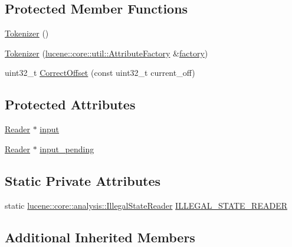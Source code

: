 \subsection*{Protected Member Functions}
\begin{DoxyCompactItemize}
\item 
\mbox{\hyperlink{classlucene_1_1core_1_1analysis_1_1Tokenizer_a2a6c04ea8c784f66bebcb6df7073769c}{Tokenizer}} ()
\item 
\mbox{\hyperlink{classlucene_1_1core_1_1analysis_1_1Tokenizer_a88b02b1592e51baa95cd41090183ee8b}{Tokenizer}} (\mbox{\hyperlink{classlucene_1_1core_1_1util_1_1AttributeFactory}{lucene\+::core\+::util\+::\+Attribute\+Factory}} \&\mbox{\hyperlink{classlucene_1_1core_1_1util_1_1AttributeSource_a1376420a752f337a0fdb582bdf160eba}{factory}})
\item 
uint32\+\_\+t \mbox{\hyperlink{classlucene_1_1core_1_1analysis_1_1Tokenizer_a4c10a2cdbd688233cddb87151a8bf168}{Correct\+Offset}} (const uint32\+\_\+t current\+\_\+off)
\end{DoxyCompactItemize}
\subsection*{Protected Attributes}
\begin{DoxyCompactItemize}
\item 
\mbox{\hyperlink{classlucene_1_1core_1_1analysis_1_1Reader}{Reader}} $\ast$ \mbox{\hyperlink{classlucene_1_1core_1_1analysis_1_1Tokenizer_a376df6bd42b18d1175168b9529b7665e}{input}}
\item 
\mbox{\hyperlink{classlucene_1_1core_1_1analysis_1_1Reader}{Reader}} $\ast$ \mbox{\hyperlink{classlucene_1_1core_1_1analysis_1_1Tokenizer_ac968137c9d44ef57a69c8df4e6e628ff}{input\+\_\+pending}}
\end{DoxyCompactItemize}
\subsection*{Static Private Attributes}
\begin{DoxyCompactItemize}
\item 
static \mbox{\hyperlink{classlucene_1_1core_1_1analysis_1_1IllegalStateReader}{lucene\+::core\+::analysis\+::\+Illegal\+State\+Reader}} \mbox{\hyperlink{classlucene_1_1core_1_1analysis_1_1Tokenizer_a8ddffe6457c8764f4a14326449a42abc}{I\+L\+L\+E\+G\+A\+L\+\_\+\+S\+T\+A\+T\+E\+\_\+\+R\+E\+A\+D\+ER}}
\end{DoxyCompactItemize}
\subsection*{Additional Inherited Members}


